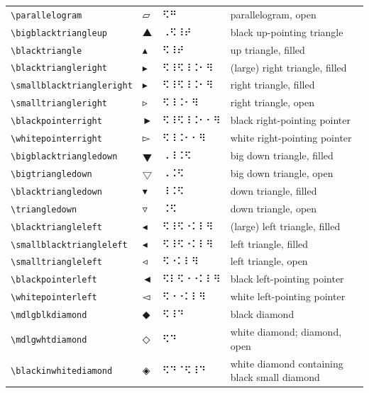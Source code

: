 \documentclass[oneside]{article}
\begin{document}
\begin{longtable}{llll}
\verb|\parallelogram| & $\parallelogram$ &  ⠫⠛  & {parallelogram, open} \\[2ex]
\verb|\bigblacktriangleup| & $\bigblacktriangleup$ &  ⠠⠫⠸⠞  & {black up-pointing triangle} \\[2ex]
\verb|\blacktriangle| & $\blacktriangle$ &  ⠫⠸⠞  & {up triangle, filled} \\[2ex]
\verb|\blacktriangleright| & $\blacktriangleright$ &  ⠫⠸⠫⠸⠨⠂⠻  & {(large) right triangle, filled} \\[2ex]
\verb|\smallblacktriangleright| & $\smallblacktriangleright$ &  ⠫⠸⠫⠸⠨⠂⠻  & {right triangle, filled} \\[2ex]
\verb|\smalltriangleright| & $\smalltriangleright$ &  ⠫⠸⠨⠂⠻  & {right triangle, open} \\[2ex]
\verb|\blackpointerright| & $\blackpointerright$ &  ⠫⠸⠫⠸⠨⠂⠂⠻  & {black right-pointing pointer} \\[2ex]
\verb|\whitepointerright| & $\whitepointerright$ &  ⠫⠸⠨⠂⠂⠻  & {white right-pointing pointer} \\[2ex]
\verb|\bigblacktriangledown| & $\bigblacktriangledown$ &  ⠠⠸⠨⠫  & {big down triangle, filled} \\[2ex]
\verb|\bigtriangledown| & $\bigtriangledown$ &  ⠠⠨⠫  & {big down triangle, open} \\[2ex]
\verb|\blacktriangledown| & $\blacktriangledown$ &  ⠸⠨⠫  & {down triangle, filled} \\[2ex]
\verb|\triangledown| & $\triangledown$ &  ⠨⠫  & {down triangle, open} \\[2ex]
\verb|\blacktriangleleft| & $\blacktriangleleft$ &  ⠫⠸⠫⠐⠅⠇⠻  & {(large) left triangle, filled} \\[2ex]
\verb|\smallblacktriangleleft| & $\smallblacktriangleleft$ &  ⠫⠸⠫⠐⠅⠇⠻  & {left triangle, filled} \\[2ex]
\verb|\smalltriangleleft| & $\smalltriangleleft$ &  ⠫⠐⠅⠇⠻  & {left triangle, open} \\[2ex]
\verb|\blackpointerleft| & $\blackpointerleft$ &  ⠫⠇⠫⠐⠐⠅⠇⠻  & {black left-pointing pointer} \\[2ex]
\verb|\whitepointerleft| & $\whitepointerleft$ &  ⠫⠐⠐⠅⠇⠻  & {white left-pointing pointer} \\[2ex]
\verb|\mdlgblkdiamond| & $\mdlgblkdiamond$ &  ⠫⠸⠙  & {black diamond} \\[2ex]
\verb|\mdlgwhtdiamond| & $\mdlgwhtdiamond$ &  ⠫⠙  & {white diamond; diamond, open} \\[2ex]
\verb|\blackinwhitediamond| & $\blackinwhitediamond$ &  ⠫⠙⠈⠫⠸⠙  & {white diamond containing black small diamond} \\[2ex]

\end{longtable}
\end{document}

